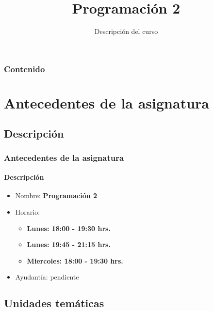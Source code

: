 \documentclass{beamer}
\title[\textbf{Programaci\'on 2}]{\textbf{Programaci\'on 2}}
\subtitle{Descripci\'on del curso}
\institute[Universidad de Valpara\'iso]
\begin{document}
	\begin{frame}
		\titlepage
	\end{frame}

	\begin{frame}
		\frametitle{Contenido}
		\tableofcontents%
	\end{frame}

	\section{Antecedentes de la asignatura}

		\subsection{Descripci\'on}

		\begin{frame}
			\frametitle{Antecedentes de la asignatura}
			\framesubtitle{Descripci\'on}

			\begin{itemize}
				\item Nombre: \textbf{Programaci\'on 2}
				\item Horario:
				\begin{itemize}
					\item \textbf{Lunes: 18:00 - 19:30 hrs.}
					\item \textbf{Lunes: 19:45 - 21:15 hrs.}
					\item \textbf{Miercoles: 18:00 - 19:30 hrs.}
				\end{itemize}
				\item Ayudant\'ia: pendiente
			\end{itemize}
		\end{frame}

		\subsection{Unidades tem\'aticas}
\end{document}
